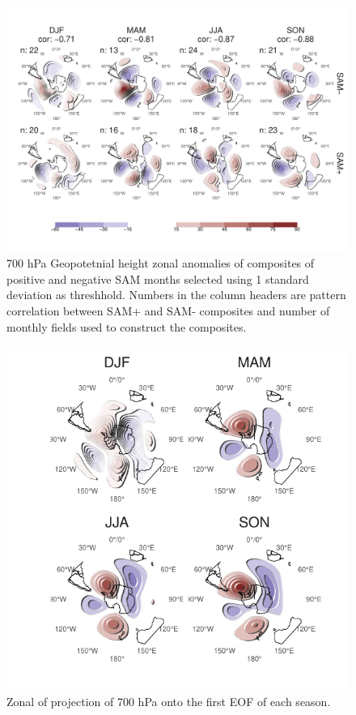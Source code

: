 \documentclass[]{ametsocV5}
\begin{document}
\begin{figure}
\includegraphics{A9-1} \caption[700 hPa Geopotetnial height zonal anomalies of composites of positive and negative SAM months selected using 1 standard deviation as threshhold]{700 hPa Geopotetnial height zonal anomalies of composites of positive and negative SAM months selected using 1 standard deviation as threshhold. Numbers in the column headers are pattern correlation between SAM+ and SAM- composites and number of monthly fields used to construct the composites.}\label{fig:A9}
\end{figure}

\begin{figure}
\includegraphics{A10-1} \caption[Zonal of projection of 700 hPa onto the first EOF of each season]{Zonal of projection of 700 hPa onto the first EOF of each season.}\label{fig:A10}
\end{figure}
\end{document}
